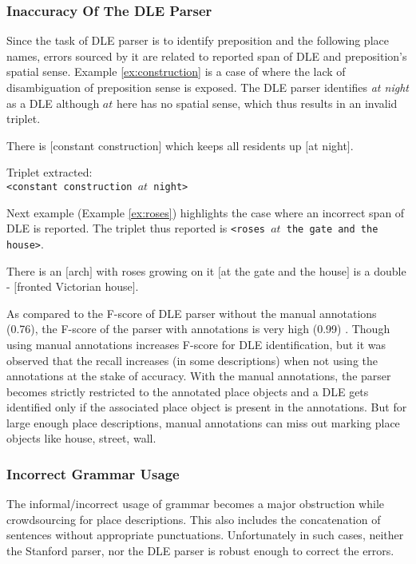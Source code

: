 \documentclass{acm_proc_article-sp}
\begin{document}
\subsubsection{Inaccuracy Of The DLE Parser}
Since the task of DLE parser is to identify preposition and the following place names, errors sourced by it are related to reported span of DLE and preposition's spatial sense. Example \ref{ex:construction} is a case of where the lack of disambiguation of preposition sense is exposed. The DLE parser identifies \textit{at night} as a DLE although $at$ here has no spatial sense, which thus results in an invalid triplet.
\label{subsub:DLE}
\begin{example}
\label{ex:construction}
There is $[$constant construction$]$ which keeps all residents up $[$at night$]$.
\end{example}
Triplet extracted:\\
\texttt{<constant construction $at$ night>}

Next example (Example \ref{ex:roses}) highlights the case where an incorrect span of DLE is reported. The triplet thus reported is \texttt{<roses $at$ the gate and the house>}.
\begin{example}
\label{ex:roses}
There is an $[$arch$]$ with roses growing on it $[$at the gate and the house$]$ is a double - $[$fronted Victorian house$]$.
\end{example}
As compared to the F-score of DLE parser without the manual annotations (0.76), the F-score of the parser with annotations is very high (0.99) \cite{fei:locative}. 
Though using manual annotations increases F-score for DLE identification, but it was observed that the recall increases (in some descriptions) when not using the annotations at the stake of accuracy. With the manual annotations, the parser becomes strictly restricted to the annotated place objects and a DLE gets identified only if the associated place object is present in the annotations. But for large enough place descriptions, manual annotations can miss out marking place objects like house, street, wall. 
\subsubsection{Incorrect Grammar Usage}
The informal/incorrect usage of grammar becomes a major obstruction while crowdsourcing for place descriptions. This also includes the concatenation of sentences without appropriate punctuations. Unfortunately in such cases, neither the Stanford parser, nor the DLE parser is robust enough to correct the errors. 
\end{document}
